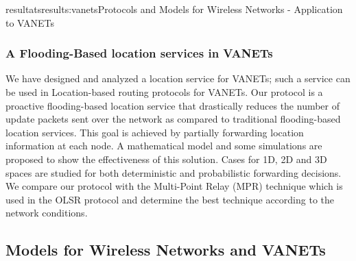 \documentclass{ra2016}
\begin{document}
\begin{module}{resultats}{results:vanets}{Protocols and Models for Wireless Networks - Application to VANETs}
%
%


\subsubsection{A Flooding-Based location services in VANETs}

\begin{participants}
\end{participants}

We have designed and analyzed a location service for VANETs; 
such a service can be used in Location-based routing protocols for 
VANETs. Our protocol is  a proactive
flooding-based location service that drastically reduces the
number of update packets sent over the network as compared to
traditional flooding-based location services. This goal is achieved
by partially forwarding location information at each node. A
mathematical model and some simulations are proposed to show
the effectiveness of this solution. Cases for 1D, 2D and 3D spaces
are studied for both deterministic and probabilistic forwarding
decisions. We compare our protocol with the Multi-Point Relay (MPR) 
technique which is used in the OLSR protocol and determine the best  technique 
according to the network conditions.  

\subsection{Models for Wireless Networks and VANETs}


\end{module}
\end{document}
